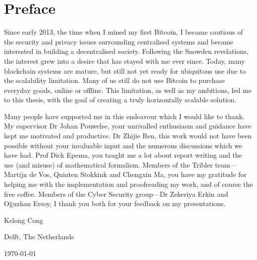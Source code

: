 \chapter*{Preface}
Since early 2013, the time when I mined my first Bitcoin, 
I became cautious of the security and privacy issues surrounding centralised systems
and became interested in building a decentralised society.
Following the Snowden revelations, the interest grew into a desire that has stayed with me ever since.
Today, many blockchain systems are mature, but still not yet ready for ubiquitous use due to the scalability limitation.
Many of us still do not use Bitcoin to purchase everyday goods, online or offline.
This limitation, as well as my ambitions, led me to this thesis,
with the goal of creating a truly horizontally scalable solution.

\vspace{1\baselineskip}

\noindent
Many people have supported me in this endeavour which I would like to thank.
My supervisor Dr Johan Pouwelse, your unrivalled enthusiasm and guidance have kept me motivated and productive.
Dr Zhijie Ren, this work would not have been possible without your invaluable input and the numerous discussions which we have had.
Prof Dick Epema, you taught me a lot about report writing and the use (and misuse) of mathematical formalism.
Members of the Tribler team---Martijn de Vos, Quinten Stokkink and Chengxin Ma,
you have my gratitude for helping me with the implementation and proofreading my work,
and of course the free coffee.
Members of the Cyber Security group---Dr Zekeriya Erkin and O\u{g}uzhan Ersoy,
I thank you both for your feedback on my presentations.

\vspace{1\baselineskip}

\noindent
Kelong Cong

\vspace{1\baselineskip}

\noindent
Delft, The Netherlands

\noindent
\today

